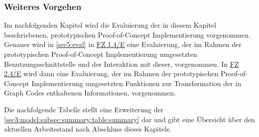 \FloatBarrier

\subsubsection{Weiteres Vorgehen}
\label{sec4:impl:subsubsec:further-approach}
Im nachfolgenden Kapitel wird die Evaluierung der in diesem Kapitel beschriebenen, prototypischen Proof-of-Concept Implementierung vorgenommen.
Genauer wird in \cref{sec5:eval} in \hyperref[sec5:eval:subsec:fz-explainability]{FZ 1.4/E} eine Evaluierung, der im Rahmen der prototypischen Proof-of-Concept Implementierung umgesetzten Benutzungsschnittstelle und der Interaktion mit dieser, vorgenommen.
In \hyperref[sec5:eval:subsec:fz-integration]{FZ 2.4/E} wird dann eine Evaluierung, der im Rahmen der prototypischen Proof-of-Concept Implementierung umgesetzten Funktionen zur Transformation der in Graph Codes enthaltenen Informationen, vorgenommen.

Die nachfolgende Tabelle stellt eine Erweiterung der \cref{sec3:model:subsec:summary:table:summary} dar und gibt eine Übersicht über den aktuellen Arbeitsstand nach Abschluss dieses Kapitels.


